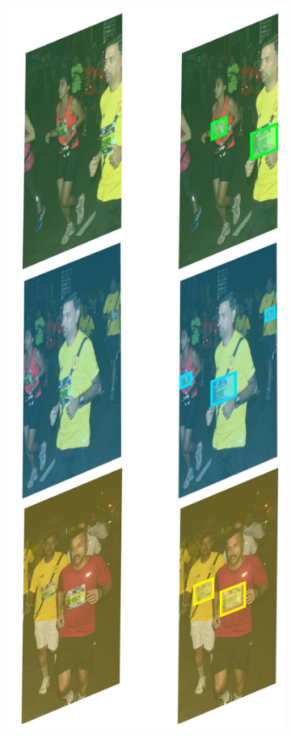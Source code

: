 \begin{landscape}
\begin{figure}[p]
\begin{subfigure}[b]{0.23\paperwidth}
      \includegraphics[width=\textwidth]{images/processing/yolo_crop_bib_detection}

\end{subfigure}
\end{figure}
\end{landscape}
